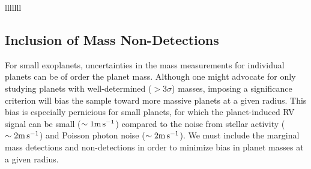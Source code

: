 \documentclass[iop]{emulateapj}
\begin{document}
\begin{deluxetable*}{lllllll}



\label{tab:mrf}

\end{deluxetable*}

\subsection{Inclusion of Mass Non-Detections}
For small exoplanets, uncertainties in the mass measurements for individual planets can be of order the planet mass.  Although one might advocate for only studying planets with well-determined ($>3\sigma$) masses, imposing a significance criterion will bias the sample toward more massive planets at a given radius.  This bias is especially pernicious for small planets, for which the planet-induced RV signal can be small ($\sim1\rm m\,s^{-1}$) compared to the noise from stellar activity ($\sim2\rm m\,s^{-1}$) and Poisson photon noise ($\sim2\rm m\,s^{-1}$).  We must include the marginal mass detections and non-detections in order to minimize bias in planet masses at a given radius.  
\end{document}
